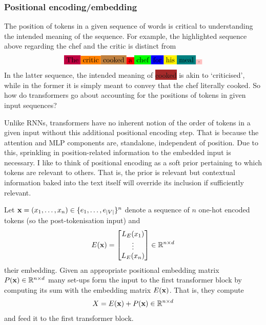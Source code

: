 \documentclass[11pt]{article}
\begin{document}
\subsubsection{Positional encoding/embedding}
The position of tokens in a given sequence of words is critical to understanding the intended meaning of the sequence. For example, the highlighted sequence above regarding the chef and the critic is distinct from
$$
\colorbox{purple}{The}\colorbox{orange}{critic}\colorbox{brown}{cooked}\colorbox{red}{a}\colorbox{green}{chef}\colorbox{blue}{for}\colorbox{yellow}{his}\colorbox{teal}{meal}\colorbox{pink}{.}
$$
In the latter sequence, the intended meaning of \colorbox{brown}{cooked} is akin to `criticised', while in the former it is simply meant to convey that the chef literally cooked. So how do transformers go about accounting for the positions of tokens in given input sequences?

Unlike RNNs, transformers have no inherent notion of the order of tokens in a given input without this additional positional encoding step. That is because the attention and MLP components are, standalone, independent of position. Due to this, sprinkling in position-related information to the embedded input is necessary. I like to think of positional encoding as a soft prior pertaining to which tokens are relevant to others. That is, the prior is relevant but contextual information baked into the text itself will override its inclusion if sufficiently relevant.

Let $\mathbf{x}=(x_1,\dots,x_n)\in\{e_1,\dots,e_{|V|}\}^n$ denote a sequence of $n$ one-hot encoded tokens (so the post-tokenisation input) and
$$
E(\mathbf{x})
=
\begin{bmatrix}
    L_E(x_1)\\
    \vdots\\
    L_E(x_n)
\end{bmatrix}
\in\mathbb{R}^{n\times d}
$$
their embedding. Given an appropriate positional embedding matrix $P(\mathbf{x})\in\mathbb{R}^{n\times d}$ many set-ups form the input to the first transformer block by computing its sum with the embedding matrix $E(\mathbf{x})$. That is, they compute
$$
X
=
E(\mathbf{x})+P(\mathbf{x})\in\mathbb{R}^{n\times d}
$$
and feed it to the first transformer block.
\end{document}
